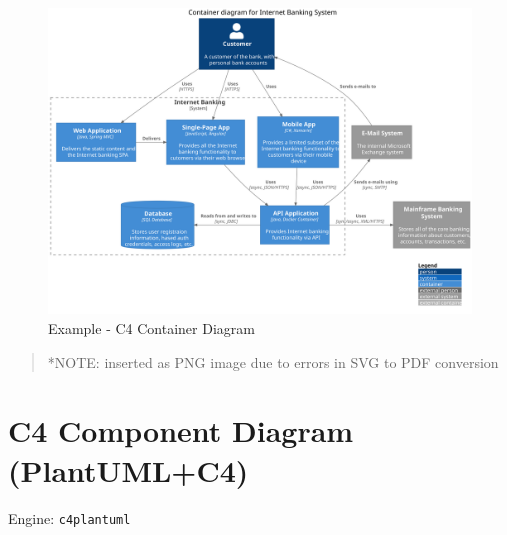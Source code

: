 \documentclass[
  12pt,
  a4paper,
  12pt,
  oneside,
  openany]{book}
\begin{document}
\begin{figure}

{\centering \includegraphics{generated/diagrams-examples-c4plantuml-container-Rmd} 

}

\caption{Example - C4 Container Diagram}\label{fig:examples-c4container}
\end{figure}

\begin{quote}
*NOTE: inserted as PNG image due to errors in SVG to PDF conversion
\end{quote}

\newpage

\hypertarget{kroki-c4component}{%
\section{C4 Component Diagram (PlantUML+C4)}\label{kroki-c4component}}

Engine: \texttt{c4plantuml}
\end{document}
